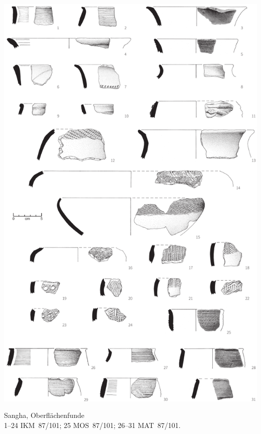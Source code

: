 \begin{pl}[H]
	\includegraphics{plt/Taf59.pdf}
	\vspace{.75em}\caption{\mbox{Sangha}, Oberflächenfunde \\ 1--24 IKM~87/101; 25 MOS~87/101; 26--31 MAT~87/101.}
	\label{pl:59}
\end{pl}

